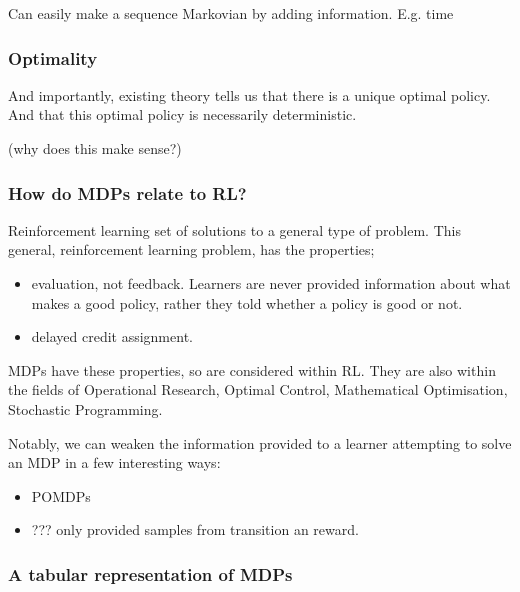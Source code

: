 Can easily make a sequence Markovian by adding information. E.g.
time

\hypertarget{optimality}{%
\subsubsection{Optimality}\label{optimality}}

And importantly, existing theory tells us that there is a unique optimal
policy. And that this optimal policy is necessarily deterministic.

(why does this make sense?)

\hypertarget{how-do-mdps-relate-to-rl}{%
\subsubsection{How do MDPs relate to
RL?}\label{how-do-mdps-relate-to-rl}}

Reinforcement learning set of solutions to a general type of problem.
This general, reinforcement learning problem, has the properties;

\begin{itemize}
\tightlist
\item
  evaluation, not feedback. Learners are never provided information
  about what makes a good policy, rather they told whether a policy is
  good or not.
\item
  delayed credit assignment.
\end{itemize}

MDPs have these properties, so are considered within RL. They are also
within the fields of Operational Research, Optimal Control, Mathematical
Optimisation, Stochastic Programming.

Notably, we can weaken the information provided to a learner attempting
to solve an MDP in a few interesting ways:

\begin{itemize}
\tightlist
\item
  POMDPs
\item
  ??? only provided samples from transition an reward.
\end{itemize}

\hypertarget{a-tabular-representation-of-mdps}{%
\subsubsection{A tabular representation of
MDPs}\label{a-tabular-representation-of-mdps}}

